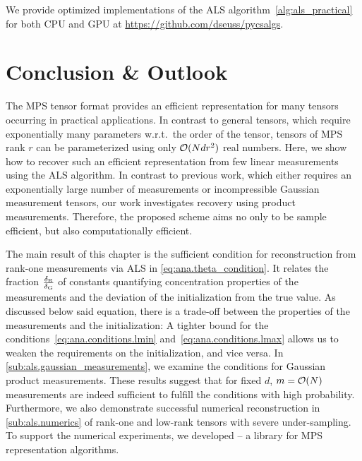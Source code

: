 We provide optimized implementations of the ALS algorithm~\ref{alg:als_practical} for both CPU and GPU at \url{https://github.com/dseuss/pycsalgs}.



\section{Conclusion \& Outlook}%
\label{sec:conclusion}

The MPS tensor format provides an efficient representation for many tensors occurring in practical applications.
In contrast to general tensors, which require exponentially many parameters w.r.t.\ the order of the tensor, tensors of MPS rank $r$ can be parameterized using only ${\mathcal{O}}(N d r^2)$ real numbers.
Here, we show how to recover such an efficient representation from few linear measurements using the ALS algorithm.
In contrast to previous work, which either requires an exponentially large number of measurements or incompressible Gaussian measurement tensors, our work investigates recovery using product measurements.
Therefore, the proposed scheme aims no only to be sample efficient, but also computationally efficient.

The main result of this chapter is the sufficient condition for reconstruction from rank-one measurements via ALS in \cref{eq:ana.theta_condition}.
It relates the fraction $\frac{\delta_\mathrm{B}}{\delta_\mathrm{G}}$ of constants quantifying concentration properties of the measurements and the deviation of the initialization from the true value.
As discussed below said equation, there is a trade-off between the properties of the measurements and the initialization:
A tighter bound for the conditions~\eqref{eq:ana.conditions.lmin} and~\eqref{eq:ana.conditions.lmax} allows us to weaken the requirements on the initialization, and vice versa.
In \cref{sub:als.gaussian_measurements}, we examine the conditions for Gaussian product measurements.
These results suggest that for fixed $d$, $m = {\mathcal{O}}(N)$ measurements are indeed sufficient to fulfill the conditions with high probability.
Furthermore, we also demonstrate successful numerical reconstruction in \cref{sub:als.numerics} of rank-one and low-rank tensors with severe under-sampling.
To support the numerical experiments, we developed \mpnum{} -- a library for MPS representation algorithms.\\



